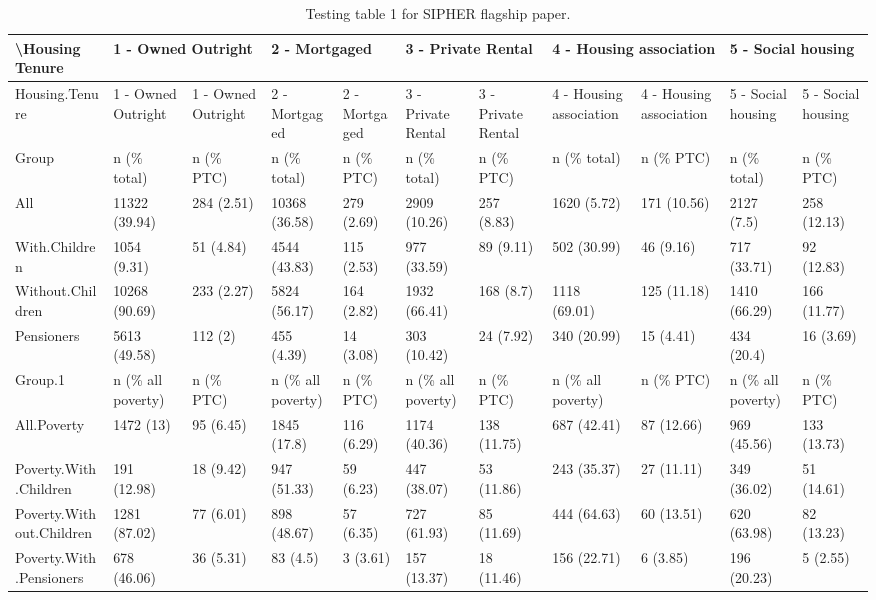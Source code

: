 \begin{table}[ht]
\centering
\begin{tabular}{|l|l|l|l|l|l|l|l|l|l|l|}
  \hline
  \textbackslash Housing Tenure  & \multicolumn{2}{|l}{1 - Owned Outright} & \multicolumn{2}{|l}{2 - Mortgaged} & \multicolumn{2}{|l}{3 - Private Rental} & \multicolumn{2}{|l}{4 - Housing association} & \multicolumn{2}{|l}{5 - Social housing}\\ \hline
Housing.Tenure & 1 - Owned Outright & 1 - Owned Outright & 2 - Mortgaged & 2 - Mortgaged & 3 - Private Rental & 3 - Private Rental & 4 - Housing association & 4 - Housing association & 5 - Social housing & 5 - Social housing \\ 
   \hline
Group & n (\% total) & n (\% PTC) & n (\% total) & n (\% PTC) & n (\% total) & n (\% PTC) & n (\% total) & n (\% PTC) & n (\% total) & n (\% PTC) \\ 
  All & 11322 (39.94) & 284 (2.51) & 10368 (36.58) & 279 (2.69) & 2909 (10.26) & 257 (8.83) & 1620 (5.72) & 171 (10.56) & 2127 (7.5) & 258 (12.13) \\ 
  With.Children & 1054 (9.31) & 51 (4.84) & 4544 (43.83) & 115 (2.53) & 977 (33.59) & 89 (9.11) & 502 (30.99) & 46 (9.16) & 717 (33.71) & 92 (12.83) \\ 
  Without.Children & 10268 (90.69) & 233 (2.27) & 5824 (56.17) & 164 (2.82) & 1932 (66.41) & 168 (8.7) & 1118 (69.01) & 125 (11.18) & 1410 (66.29) & 166 (11.77) \\ 
   \hline
Pensioners & 5613 (49.58) & 112 (2) & 455 (4.39) & 14 (3.08) & 303 (10.42) & 24 (7.92) & 340 (20.99) & 15 (4.41) & 434 (20.4) & 16 (3.69) \\ 
   \hline
Group.1 & n (\% all poverty) & n (\% PTC) & n (\% all poverty) & n (\% PTC) & n (\% all poverty) & n (\% PTC) & n (\% all poverty) & n (\% PTC) & n (\% all poverty) & n (\% PTC) \\ 
  All.Poverty & 1472 (13) & 95 (6.45) & 1845 (17.8) & 116 (6.29) & 1174 (40.36) & 138 (11.75) & 687 (42.41) & 87 (12.66) & 969 (45.56) & 133 (13.73) \\ 
  Poverty.With.Children & 191 (12.98) & 18 (9.42) & 947 (51.33) & 59 (6.23) & 447 (38.07) & 53 (11.86) & 243 (35.37) & 27 (11.11) & 349 (36.02) & 51 (14.61) \\ 
  Poverty.Without.Children & 1281 (87.02) & 77 (6.01) & 898 (48.67) & 57 (6.35) & 727 (61.93) & 85 (11.69) & 444 (64.63) & 60 (13.51) & 620 (63.98) & 82 (13.23) \\ 
   \hline
Poverty.With.Pensioners & 678 (46.06) & 36 (5.31) & 83 (4.5) & 3 (3.61) & 157 (13.37) & 18 (11.46) & 156 (22.71) & 6 (3.85) & 196 (20.23) & 5 (2.55) \\ 
  \end{tabular}
\caption{Testing table 1 for SIPHER flagship paper.} 
\end{table}
